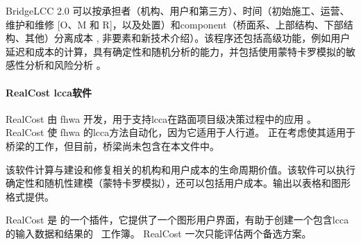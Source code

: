 BridgeLCC 2.0 可以按承担者（机构、用户和第三方）、时间（初始施工、运营、维护和维修 [O、M 和 R]，以及处置）和\gls*{component}（桥面系、上部结构、下部结构、其他）分离成本 , 非要素和新技术介绍）。该程序还包括高级功能，例如用户延迟和成本的计算，具有确定性和随机分析的能力，并包括使用蒙特卡罗模拟的敏感性分析和风险分析 \cite{ehlen2003b}。

\paragraph*{RealCost \acrlong*{lcca}软件}

RealCost 由 \acrshort*{fhwa} 开发，用于支持\acrlong*{lcca}在路面项目级决策过程中的应用 \cite{fhwa2004r}。 RealCost 使 \acrshort*{fhwa} 的\acrlong*{lcca}方法自动化，因为它适用于人行道。 正在考虑使其适用于桥梁的工作，但目前，桥梁尚未包含在本文件中。

该软件计算与建设和修复相关的机构和用户成本的生命周期价值。该软件可以执行确定性和随机性建模（蒙特卡罗模拟），还可以包括用户成本。输出以表格和图形格式提供。

RealCost 是 \Microsoft[\Excel] 的一个插件，它提供了一个图形用户界面，有助于创建一个包含\acrlong*{lcca}的输入数据和结果的 \Excel\ 工作簿。 RealCost 一次只能评估两个备选方案。
